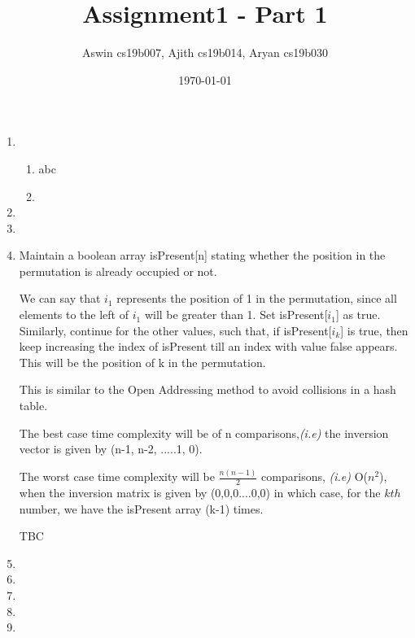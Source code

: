 \documentclass[12pt]{article}
\title{Assignment1 - Part 1}
\author{Aswin cs19b007, Ajith cs19b014, Aryan cs19b030}
\date{\today}
\begin{document}
\maketitle

\newpage
\begin{enumerate}
    \item\begin{enumerate}
        \item abc
        \item
    \end{enumerate}
    \item 
    \item
    \item Maintain a boolean array isPresent[n] stating whether the position in the permutation is already occupied or not.
    
    We can say that $i_1$ represents the position of 1 in the permutation, since all elements to the left of $i_1$ will be greater than 1. Set isPresent[$i_1$] as true.
    Similarly, continue for the other values, such that, if isPresent[$i_k$] is true, then keep increasing the index of isPresent till an index with value false appears. This will be the position of k in the permutation.
    
    This is similar to the Open Addressing method to avoid collisions in a hash table.
    
    The best case time complexity will be of n comparisons,\textit{(i.e)} the inversion vector is given by (n-1, n-2, .....1, 0).
    
    The worst case time complexity will be $\frac{n(n-1)}{2}$ comparisons, \textit{(i.e)} O($n^2$), when the inversion matrix is given by (0,0,0....0,0)
    in which case, for the $kth$ number, we have the isPresent array (k-1) times.
    
    TBC
    \item
    \item
    \item
    \item
    \item
\end{enumerate}
\end{document}
